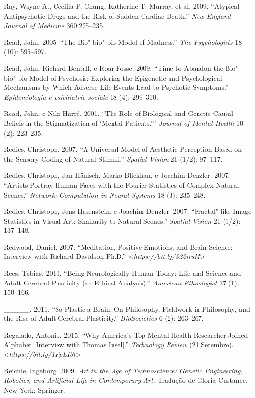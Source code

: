 {\begin{Parskip}
Ray, Wayne A., Cecilia P. Chung, Katherine T. Murray, et al. 2009.
``Atypical Antipsychotic Drugs and the Risk of Sudden Cardiac Death.''
\emph{New England Journal of Medicine} 360:225--235.

Read, John. 2005. ``The Bio"-bio"-bio Model of Madness.'' \emph{The
Psychologists} 18 (10): 596--597.

Read, John, Richard Bentall, e Roar Fosse. 2009. ``Time to Abandon the
Bio"-bio"-bio Model of Psychosis: Exploring the Epigenetic and
Psychological Mechanisms by Which Adverse Life Events Lead to Psychotic
Symptoms.'' \emph{Epidemiologia e psichiatria sociale} 18 (4): 299--310.

Read, John, e Niki Harré. 2001. ``The Role of Biological and Genetic
Causal Beliefs in the Stigmatization of `Mental Patients.'''
\emph{Journal of Mental Health} 10 (2): 223--235.

Redies, Christoph. 2007. ``A Universal Model of Aesthetic Perception
Based on the Sensory Coding of Natural Stimuli.'' \emph{Spatial Vision}
21 (1/2): 97--117.

Redies, Christoph, Jan Hänisch, Marko Blickhan, e Joachim Denzler. 2007.
``Artists Portray Human Faces with the Fourier Statistics of Complex
Natural Scenes.'' \emph{Network: Computation in Neural Systems} 18 (3):
235--248.

Redies, Christoph, Jens Hasenstein, e Joachim Denzler. 2007.
``Fractal"-like Image Statistics in Visual Art: Similarity to Natural
Scenes.'' \emph{Spatial Vision} 21 (1/2): 137--148.

Redwood, Daniel. 2007. ``Meditation, Positive Emotions, and Brain
Science: Interview with Richard Davidson Ph.D.''
\textless{}\emph{https://bit.ly/322irsM}\textgreater{}

Rees, Tobias. 2010. ``Being Neurologically Human Today: Life and Science
and Adult Cerebral Plasticity (an Ethical Analysis).'' \emph{American
Ethnologist} 37 (1): 150--166.

\_\_\_\_\_. 2011. ``So Plastic a Brain: On Philosophy, Fieldwork in
Philosophy, and the Rise of Adult Cerebral Plasticity.''
\emph{BioSocieties} 6 (2): 263--267.

Regalado, Antonio. 2015. ``Why America's Top Mental Health Researcher
Joined Alphabet {[}Interview with Thomas Insel{]}.'' \emph{
Technology Review} (21 Setembro).
\textless{}\emph{https://bit.ly/1FpLI3t}\textgreater{}

Reichle, Ingeborg. 2009. \emph{Art in the Age of Technoscience: Genetic
Engineering, Robotics, and Artificial Life in Contemporary Art.}
Tradução de Gloria Custance. New York: Springer.


\end{Parskip}}
